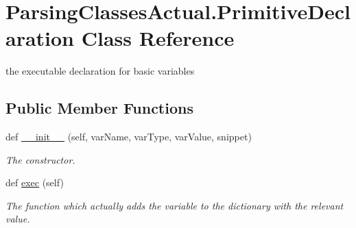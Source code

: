 \hypertarget{class_parsing_classes_actual_1_1_primitive_declaration}{}\section{Parsing\+Classes\+Actual.\+Primitive\+Declaration Class Reference}
\label{class_parsing_classes_actual_1_1_primitive_declaration}


the executable declaration for basic variables  


\subsection*{Public Member Functions}
\begin{DoxyCompactItemize}
\item 
def \hyperlink{class_parsing_classes_actual_1_1_primitive_declaration_a597dcbd2c1f074b88dc6ca01f2009983}{\+\_\+\+\_\+init\+\_\+\+\_\+} (self, var\+Name, var\+Type, var\+Value, snippet)
\begin{DoxyCompactList}\small\item\em The constructor. \end{DoxyCompactList}\item 
\mbox{\label{class_parsing_classes_actual_1_1_primitive_declaration_aeeab13c37fc60f2d86e9b72fb30de758}} 
def \hyperlink{class_parsing_classes_actual_1_1_primitive_declaration_aeeab13c37fc60f2d86e9b72fb30de758}{exec} (self)
\begin{DoxyCompactList}\small\item\em The function which actually adds the variable to the dictionary with the relevant value. \end{DoxyCompactList}\end{DoxyCompactItemize}
